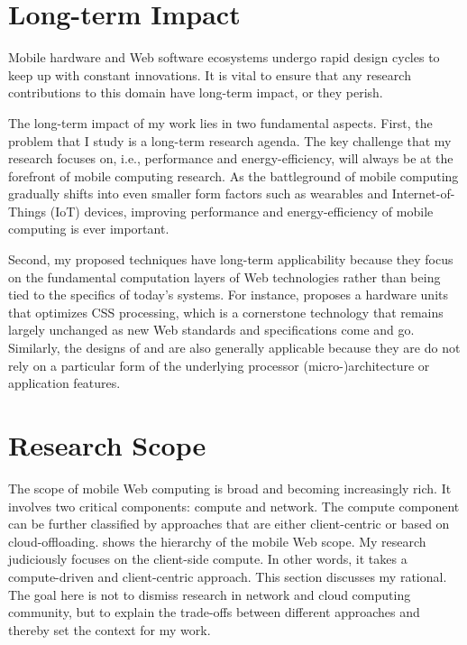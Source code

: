 \section{Long-term Impact}
\label{sec:intro:impact}

Mobile hardware and Web software ecosystems undergo rapid design cycles to keep up with constant innovations. It is vital to ensure that any research contributions to this domain have long-term impact, or they perish.

The long-term impact of my work lies in two fundamental aspects. First, the problem that I study is a long-term research agenda. The key challenge that my research focuses on, i.e.,  performance and energy-efficiency, will always be at the forefront of mobile computing research. As the battleground of mobile computing gradually shifts into even smaller form factors such as wearables and Internet-of-Things (IoT) devices, improving performance and energy-efficiency of mobile computing is ever important.

Second, my proposed techniques have long-term applicability because they focus on the fundamental computation layers of Web technologies rather than being tied to the specifics of today's systems. For instance, \webcore proposes a hardware units that optimizes CSS processing, which is a cornerstone technology that remains largely unchanged as new Web standards and specifications come and go. Similarly, the designs of \webrt and \greenweb are also generally applicable because they are do not rely on a particular form of the underlying processor (micro-)architecture or application features.

\section{Research Scope}
\label{sec:intro:scope}

The scope of mobile Web computing is broad and becoming increasingly rich. It involves two critical components: compute and network. The compute component can be further classified by approaches that are either client-centric or based on cloud-offloading.  shows the hierarchy of the mobile Web scope. My research judiciously focuses on the client-side compute. In other words, it takes a compute-driven and client-centric approach. This section discusses my rational. The goal here is not to dismiss research in network and cloud computing community, but to explain the trade-offs between different approaches and thereby set the context for my work.

